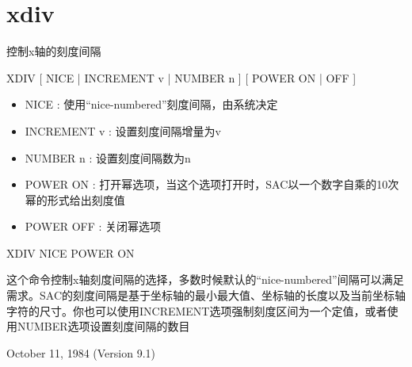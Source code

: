 \section{xdiv}
\label{cmd:xdiv}

控制x轴的刻度间隔

XDIV [ NICE | INCREMENT v | NUMBER n ] [ POWER ON | OFF ]

\begin{itemize}
\item NICE : 使用``nice-numbered''刻度间隔，由系统决定 
\item INCREMENT v : 设置刻度间隔增量为v  
\item NUMBER n : 设置刻度间隔数为n  
\item POWER ON : 打开幂选项，当这个选项打开时，SAC以一个数字自乘的10次幂的形式给出刻度值 
\item POWER OFF : 关闭幂选项 
\end{itemize}

XDIV NICE POWER ON

这个命令控制x轴刻度间隔的选择，多数时候默认的``nice-numbered''间隔可以满足需求。SAC的刻度间隔是基于坐标轴的最小最大值、坐标轴的长度以及当前坐标轴字符的尺寸。你也可以使用INCREMENT选项强制刻度区间为一个定值，或者使用NUMBER选项设置刻度间隔的数目

October 11, 1984 (Version 9.1)
